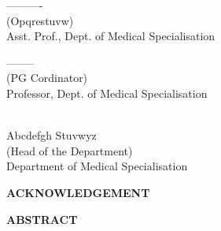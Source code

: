 \documentclass[12pt,a4paper]{report}
\def \repbranch{Medical Specialisation}
\def \repsupervisor{Opqrestuvw}
\begin{document}
\vfill  %
\noindent
\parbox[b]{0.4\linewidth}{%
    \strut
    \centering  
    ----------\\
    (\repsupervisor) \\
    Asst. Prof., Dept. of 
    \repbranch } 
\hspace{2.5cm} %
\parbox[b]{0.4\linewidth}{%
    \strut
    \centering 
    -------- \\[0cm]%
    (PG Cordinator) \\
    Professor, Dept. of 
    \repbranch } 
    \par\vspace{0cm}
    


\vspace{0.5cm}
\begin{center}
\parbox[b]{0.4\linewidth}{%
    \strut
    \centering 
    \\[2cm]
    Abcdefgh Stuvwyz \\[0cm]%
    (Head of the Department) \\
    Department of \repbranch } 
    \par\vspace{0cm}
\end{center}
\newpage

{\centering \textbf{\Large ACKNOWLEDGEMENT} \par }


\newpage


{\centering \textbf{\Large ABSTRACT} \par }
\vspace{.5cm}
\lipsum[1-2]

\break
\vspace{-150cm}
\tableofcontents

\newpage
{}
\listoffigures 
\end{document}
